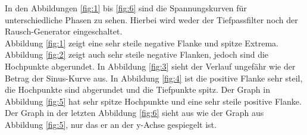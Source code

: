In den Abbildungen \ref{fig:1} bis \ref{fig:6} sind die Spannungskurven für unterschiedliche Phasen
zu sehen. Hierbei wird weder der Tiefpassfilter noch der Rausch-Generator eingeschaltet. \\
Abbildung \ref{fig:1} zeigt eine sehr steile negative Flanke und spitze Extrema. Abbildung \ref{fig:2}
zeigt auch sehr steile negative Flanken, jedoch sind die Hochpunkte abgerundet. In Abbildung \ref{fig:3}
sieht der Verlauf ungefähr wie der Betrag der Sinus-Kurve aus. In Abbildung \ref{fig:4}
ist die positive Flanke sehr steil, die Hochpunkte sind abgerundet und die Tiefpunkte spitz.
Der Graph in Abbildung \ref{fig:5} hat sehr spitze Hochpunkte und eine sehr steile positive Flanke.
Der Graph in der letzten Abbildung \ref{fig:6} sieht aus wie der Graph aus Abbildung \ref{fig:5}, nur
das er an der y-Achse gespiegelt ist.

\newpage

